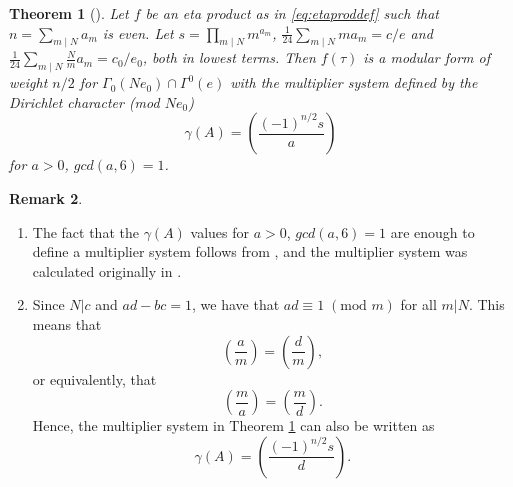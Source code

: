 \documentclass[11pt,a4paper]{amsart}
\newtheorem{theorem}{Theorem}[section]
\theoremstyle{definition}
\newtheorem{remark}[theorem]{Remark}
\begin{document}
\begin{theorem}[{\cite[Theorem 3]{gordon1993multiplicative}}] 
	\label{thm:etaprodmodeven}	
	Let $f$ be an eta product as in \eqref{eq:etaproddef} such that $n=\sum_{m \mid N} a_m$ is even. Let $s=\prod_{m \mid N} m^{a_m}$,  $\frac{1}{24}\sum_{m \mid N} ma_m=c/e$ and $\frac{1}{24}\sum_{m \mid N} \frac{N}{m}a_m=c_0/e_0$, both in lowest terms. Then $f(\tau)$ is a modular form of weight $n/2$ for $\Gamma_0(Ne_0)\cap\Gamma^0(e)$ with the multiplier system defined by the Dirichlet character (mod $Ne_0$)
	\[ \gamma(A)=\left( \frac{(-1)^{n/2} s}{a} \right) \]
	for $a>0$, $gcd(a,6)=1$.
\end{theorem}
\begin{remark}
	\label{rem:multsyst}
	\begin{enumerate}
		\item The fact that the $\gamma(A)$ values for $a>0$, $gcd(a,6)=1$ are enough to define a multiplier system follows from \cite[Lemma 3]{newman1959construction}, and the multiplier system was calculated originally in \cite[Theorem 1]{newman1959construction}.
		\item\label{it:multsyst2} Since $N|c$ and $ad-bc=1$, we have that $ad \equiv 1  \;(\textrm{mod }m)$ for all $m|N$. This means that
		\[ \left(\frac{a}{m}\right)=\left(\frac{d}{m}\right),\]
		or equivalently, that 
		\[ \left(\frac{m}{a}\right)=\left(\frac{m}{d}\right).\]
		Hence, the multiplier system in Theorem \ref{thm:etaprodmodeven} can also be written as 
		\[ \gamma(A)=\left( \frac{(-1)^{n/2} s}{d} \right). \]
	\end{enumerate}
\end{remark}

\end{document}
